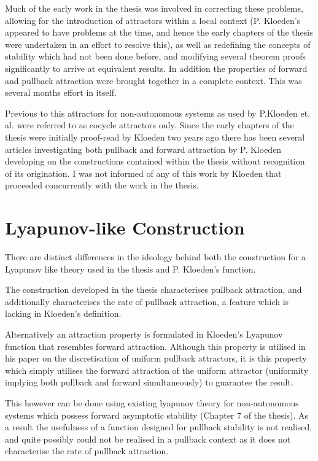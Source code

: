 \documentclass{article}
\begin{document}
Much of the early work in the thesis was involved in correcting
these problems, allowing for the introduction of attractors within
a local context (P. Kloeden's appeared to have problems at the
time, and hence the early chapters of the thesis were undertaken
in an effort to resolve this), as well as redefining the concepts
of stability which had not been done before, and modifying several
theorem proofs significantly to arrive at equivalent results. In
addition the properties of forward and pullback attraction were
brought together in a complete context. This was several months
effort in itself.

Previous to this attractors for non-autonomous systems as used by
P.Kloeden et. al. were referred to as cocycle attractors only.
Since the early chapters of the thesis were initially proof-read
by Kloeden two years ago there has been several articles
investigating both pullback and forward attraction by P. Kloeden
developing on the constructions contained within the thesis
without recognition of its origination. I was not informed of any
of this work by Kloeden that proceeded concurrently with the work
in the thesis.

\section{Lyapunov-like Construction}

There are distinct differences in the ideology behind both the
construction for a Lyapunov like theory used in the thesis and P.
Kloeden's function.

The construction developed in the thesis characterises pullback attraction, and
additionally characterises the rate of pullback attraction, a feature which is
lacking in Kloeden's definition.

Alternatively an attraction property is formulated in Kloeden's Lyapunov
function that resembles forward attraction.  Although this property
is utilised in his paper on the discretisation of uniform pullback
attractors, it is this property which simply utilises the forward attraction of
the uniform attractor (uniformity implying both pullback and forward
simultaneously) to guarantee the result.

This however can be done using existing lyapunov theory for non-autonomous
systems which possess forward asymptotic stability (Chapter 7 of the thesis). As
a result the usefulness of a function designed for pullback stability is not
realised, and quite possibly could not be realised in a pullback context as it
does not characterise the rate of pullback attraction.
\end{document}
